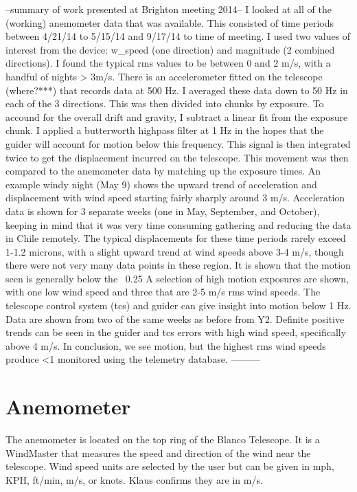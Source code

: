 \documentclass{article}
\begin{document}
--summary of work presented at Brighton meeting 2014--
I looked at all of the (working) anemometer data that was available. This consisted of time periods between 4/21/14 to 5/15/14 and 9/17/14 to time of meeting. 
I used two values of interest from the device: w_speed (one direction) and magnitude (2 combined directions). I found the typical rms values to be between 0 and 2 m/s, with a handful of nights > 3m/s. 
There is an accelerometer fitted on the telescope (where?***) that records data at 500 Hz. I averaged these data down to 50 Hz in each of the 3 directions. This was then divided into chunks by exposure. To accound for the overall drift and gravity, I subtract a linear fit from the exposure chunk. I applied a butterworth highpass filter at 1 Hz in the hopes that the guider will account for motion below this frequency. This signal is then integrated twice to get the displacement incurred on the telescope. This movement was then compared to the anemometer data by matching up the exposure times. 	
	An example windy night (May 9) shows the upward trend of acceleration and displacement with wind speed starting fairly sharply around 3 m/s. 
	Acceleration data is shown for 3 separate weeks (one in May, September, and October), keeping in mind that it was very time consuming gathering and reducing the data in Chile remotely. The typical displacements for these time periods rarely exceed 1-1.2 microns, with a slight upward trend at wind speeds above 3-4 m/s, though there were not very many data points in these region. It is shown that the motion seen is generally below the ~0.25%
	A selection of high motion exposures are shown, with one low wind speed and three that are 2-5 m/s rms wind speeds. 
	The telescope control system (tcs) and guider can give insight into motion below 1 Hz. Data are shown from two of the same weeks as before from Y2. Definite positive trends can be seen in the guider and tcs errors with high wind speed, specifically above 4 m/s. 
	In conclusion, we see motion, but the highest rms wind speeds produce <1%
 monitored using the telemetry database. 
---------

\section{Anemometer}
The anemometer is located on the top ring of the Blanco Telescope. It is a WindMaster that measures the speed and direction of the wind near the telescope.
Wind speed units are selected by the user but can be given in mph, KPH, ft/min, m/s, or knots. Klaus confirms they are in m/s.
\end{document}
